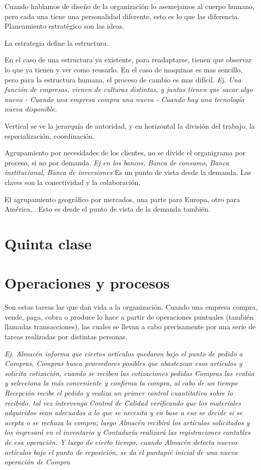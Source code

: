 \documentclass[titlepage,a4paper]{article}
\begin{document}
Cuando hablamos de diseño de la organización lo asemejamos al cuerpo humano, pero cada una tiene una personalidad diferente, esto es lo que las diferencia.
Planeamiento estratégico son las ideas.

La estrategia define la estructura.

En el caso de una estructura ya existente, para readaptarse, tienen que observar lo que ya tienen y ver como reusarlo. En el caso de maquinas es mas sencillo, pero para la estructura humana, el proceso de cambio es mas difícil. \textit{Ej. Una función de empresas, vienen de culturas distintas, y juntas tienen que sacar algo nuevo - Cuando una empresa compra una nueva - Cuando hay una tecnología nueva disponible.}

Vertical se ve la jerarquía de autoridad, y en horizontal la división del trabajo, la especialización, coordinación.

Agrupamiento por necesidades de los clientes, no se divide el organigrama por proceso, si no por demanda. \textit{Ej en los bancos, Banca de consumo, Banca institucional, Banca de inversiones} Es un punto de vista desde la demanda. Las claves son la conectividad y la colaboración.

El agrupamiento geográfico por mercados, una parte para Europa, otro para América,.. Esto es desde el punto de vista de la demanda también. 

\section*{Quinta clase}
\section{Operaciones y procesos}
Son estas tareas las que dan vida a la organización. Cuando una empresa compra, vende, paga, cobra o produce lo hace a partir de operaciones puntuales (también llamadas transacciones), las cuales se llevan a cabo precisamente por una serie de tareas realizadas por distintas personas.

\textit{ Ej.
Almacén informa que ciertos artículos quedaron bajo el punto de pedido a Compras, Compras busca
proveedores posibles que abastezcan esos artículos y solicita cotización, cuando se reciben las
cotizaciones pedidas Compras las evalúa y selecciona la más conveniente y confirma la compra, al
cabo de un tiempo Recepción recibe el pedido y realiza un primer control cuantitativo sobre lo
recibido, tal vez intervenga Control de Calidad verificando que los materiales adquiridos sean
adecuados a lo que se necesita y en base a eso se decide si se acepta o se rechaza la compra; luego
Almacén recibirá los artículos solicitados y los ingresará en el inventario y Contaduría realizará las
registraciones contables de esa operación. Y luego de cierto tiempo, cuando Almacén detecta nuevos
artículos bajo el punto de reposición, se da el puntapié inicial de una nueva operación de Compra
}
\end{document}
